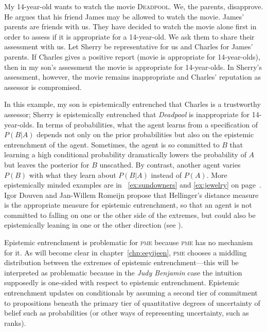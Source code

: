 \documentclass[phd,12pt,oneside]{ubcthesis}
\begin{document}
\begin{quotex}
  \label{ex:deadpool} My 14-year-old
  wants to watch the movie \textsc{Deadpool}. We, the parents,
  disapprove. He argues that his friend James may be allowed to watch
  the movie. James' parents are friends with us. They have decided to
  watch the movie alone first in order to assess if it is appropriate
  for a 14-year-old. We ask them to share their assessment with us.
  Let Sherry be representative for us and Charles for James' parents.
  If Charles gives a positive report (movie is appropriate for
  14-year-olds), then in my son's assessment the movie is appropriate
  for 14-year-olds. In Sherry's assessment, however, the movie remains
  inappropriate and Charles' reputation as assessor is compromised.
\end{quotex}

In this example, my son is epistemically entrenched that Charles is a
trustworthy assessor; Sherry is epistemically entrenched that
\emph{Deadpool} is inappropriate for 14-year-olds. In terms of
probabilities, what the agent learns from a specification of $P(B|A)$
depends not only on the prior probabilities but also on the epistemic
entrenchment of the agent. Sometimes, the agent is so committed to $B$
that learning a high conditional probability dramatically lowers the
probability of $A$ but leaves the posterior for $B$ unscathed. By
contrast, another agent varies $P(B)$ with what they learn about
$P(B|A)$ instead of $P(A)$. More epistemically minded examples are in
{\xamples}~\ref{ex:sundowners} and \ref{ex:jewelry} on
page~\pageref{page:oquohsae}. Igor Douven and Jan-Willem Romeijn
propose that Hellinger's distance measure is the appropriate measure
for epistemic entrenchment, so that an agent is not committed to
falling on one or the other side of the extremes, but could also be
epistemically leaning in one or the other direction (see
).

Epistemic entrenchment is problematic for \textsc{pme} because
\textsc{pme} has no mechanism for it. As will become clear in
chapter~\ref{chp:eeyijeen}, \textsc{pme} chooses a middling
distribution between the extremes of epistemic entrenchment---this
will be interpreted as problematic because in the \emph{Judy Benjamin} case
the intuition supposedly is one-sided with respect to epistemic
entrenchment. Epistemic entrenchment updates on conditionals by
assuming a second tier of commitment to propositions beneath the
primary tier of quantitative degrees of uncertainty of belief such as
probabilities (or other ways of representing uncertainty, such as
ranks). 
\end{document}
